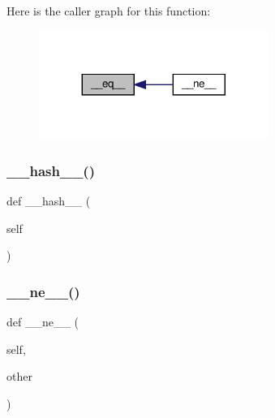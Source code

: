 Here is the caller graph for this function\+:
\nopagebreak
\begin{figure}[H]
\begin{center}
\leavevmode
\includegraphics[width=212pt]{classvlc_1_1___enum_ad794ff077f2f05f228a7109f3670ac40_icgraph}
\end{center}
\end{figure}
\mbox{\label{classvlc_1_1___enum_a3195ea87162f33a34d0079931a8194ca}} 
\subsubsection{\texorpdfstring{\+\_\+\+\_\+hash\+\_\+\+\_\+()}{\_\_hash\_\_()}}
{\footnotesize\ttfamily def \+\_\+\+\_\+hash\+\_\+\+\_\+ (\begin{DoxyParamCaption}\item[{}]{self }\end{DoxyParamCaption})}

\mbox{\label{classvlc_1_1___enum_aa0b54a20b36fcc55e1147de88d083072}} 
\subsubsection{\texorpdfstring{\+\_\+\+\_\+ne\+\_\+\+\_\+()}{\_\_ne\_\_()}}
{\footnotesize\ttfamily def \+\_\+\+\_\+ne\+\_\+\+\_\+ (\begin{DoxyParamCaption}\item[{}]{self,  }\item[{}]{other }\end{DoxyParamCaption})}

